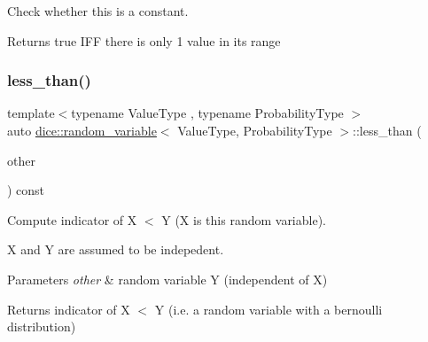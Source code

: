Check whether this is a constant. 

\begin{DoxyReturn}{Returns}
true I\+FF there is only 1 value in its range 
\end{DoxyReturn}
\mbox{\label{classdice_1_1random__variable_a8447981f77852b91874f1f888dae50ac}} 
\subsubsection{\texorpdfstring{less\+\_\+than()}{less\_than()}}
{\footnotesize\ttfamily template$<$typename Value\+Type , typename Probability\+Type $>$ \\
auto \mbox{\hyperlink{classdice_1_1random__variable}{dice\+::random\+\_\+variable}}$<$ Value\+Type, Probability\+Type $>$\+::less\+\_\+than (\begin{DoxyParamCaption}\item[{const \mbox{\hyperlink{classdice_1_1random__variable}{random\+\_\+variable}}$<$ Value\+Type, Probability\+Type $>$ \&}]{other }\end{DoxyParamCaption}) const\hspace{0.3cm}{\ttfamily [inline]}}



Compute indicator of X $<$ Y (X is this random variable). 

X and Y are assumed to be indepedent.


\begin{DoxyParams}{Parameters}
{\em other} & random variable Y (independent of X)\\
\hline
\end{DoxyParams}
\begin{DoxyReturn}{Returns}
indicator of X $<$ Y (i.\+e. a random variable with a bernoulli distribution) 
\end{DoxyReturn}
\mbox{\label{classdice_1_1random__variable_ac384c7a722412306ea7af080ceb8a8c5}} 
